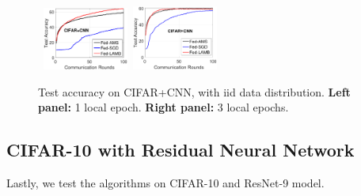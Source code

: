 \documentclass{article}
\begin{document}
\begin{figure}[h]
    \begin{center}
        \mbox{
        \includegraphics[width=0.25\textwidth]{figure/cifar_testerror_cnn_ep1_client50_iid1.eps}
        \includegraphics[width=0.25\textwidth]{figure/cifar_testerror_cnn_ep3_client50_iid1.eps}
        }
    \end{center}
	\caption{Test accuracy on CIFAR+CNN, with iid data distribution. \textbf{Left panel:} 1 local epoch. \textbf{Right panel:} 3 local epochs.}
	\label{fig:cifar-cnn-iid}
\end{figure}

\subsection{CIFAR-10 with Residual Neural Network}

Lastly, we test the algorithms on CIFAR-10 and ResNet-9 model. 
\end{document}
